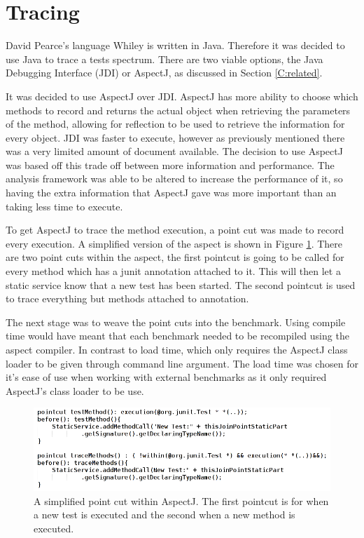 \section{Tracing}
\label{S:trace}

David Pearce's language Whiley is written in Java. Therefore it was decided to use Java to trace a tests spectrum. There are two viable options, the Java Debugging Interface (JDI) or AspectJ, as discussed in Section \ref{C:related}. 

It was decided to use AspectJ over JDI. AspectJ has more ability to choose which methods to record and returns the actual object when retrieving the parameters of the method, allowing for reflection to be used to retrieve the information for every object. JDI was faster to execute, however as previously mentioned there was a very limited amount of document available. The decision to use AspectJ was based off this trade off between more information and performance. The analysis framework was able to be altered to increase the performance of it, so having the extra information that AspectJ gave was more important than an taking less time to execute.

To get AspectJ to trace the method execution, a point cut was made to record every execution. A simplified version of the aspect is shown in Figure \ref{fig:aspectused}. There are two point cuts within the aspect, the first pointcut is going to be called for every method which has a junit \@Test annotation attached to it. This will then let a static service know that a new test has been started. The second pointcut is used to trace everything but methods attached to \@Test annotation. 

The next stage was to weave the point cuts into the benchmark. Using compile time would have meant that each benchmark needed to be recompiled using the aspect compiler. In contrast to load time, which only requires the AspectJ class loader to be given through command line argument. The load time was chosen for it's ease of use when working with external benchmarks as it only required AspectJ's class loader to be use.

\begin{figure}[h]
\begin{center}
\includegraphics[width = \textwidth]{aspect.png}
\end{center}
\caption{A simplified point cut within AspectJ. The first pointcut is for when a new test is executed and the second when a new method is executed.}
\label{fig:aspectused}
\end{figure}

